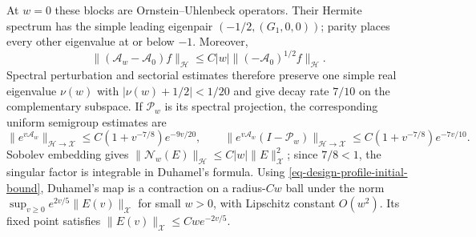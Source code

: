 \documentclass[mnsc]{informs3}
\begin{document}
\begin{APPENDICES}
{At $w=0$ these blocks are Ornstein--Uhlenbeck operators. Their Hermite
spectrum has the simple leading eigenpair
$(-1/2,(G_1,0,0))$; parity places every other eigenvalue at or below
$-1$. Moreover,
\[
\|(\mathcal A_w-\mathcal A_0)f\|_{\mathscr H}
\leq C|w|\|(-\mathcal A_0)^{1/2}f\|_{\mathscr H}.
\]
Spectral perturbation \citep[][Chapter~VII, Sections~1--2]{Kato1980}
and sectorial estimates \citep[][Proposition~3.2.2 and Chapter~5]{LorenziEtAl2005}
therefore preserve one simple real eigenvalue $\nu(w)$ with
$|\nu(w)+1/2|<1/20$ and give decay rate $7/10$ on the complementary
subspace. If $\mathscr P_w$ is its spectral projection, the corresponding
uniform semigroup estimates are
\[
\|e^{v\mathcal A_w}\|_{\mathscr H\to\mathscr X}
\leq C(1+v^{-7/8})e^{-9v/20},\qquad
\|e^{v\mathcal A_w}(I-\mathscr P_w)\|_{\mathscr H\to\mathscr X}
\leq C(1+v^{-7/8})e^{-7v/10}.
\]
Sobolev embedding gives $\|\mathscr N_w(E)\|_{\mathscr H}\leq C|w|\|E\|_{\mathscr X}^2$;
since $7/8<1$, the singular factor is integrable in Duhamel's formula.
Using \eqref{eq-design-profile-initial-bound}, Duhamel's map is a contraction
on a radius-$Cw$ ball under the norm $\sup_{v\geq0}e^{2v/5}\|E(v)\|_{\mathscr X}$
for small $w>0$, with Lipschitz constant $O(w^2)$. Its fixed point satisfies
$\|E(v)\|_{\mathscr X}\leq Cwe^{-2v/5}$.

}
\end{APPENDICES}
\end{document}
